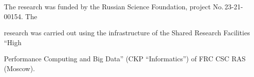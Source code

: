














\Ack



\vspace*{-3pt}





\noindent

The research was funded by the Russian Science Foundation, project No.\,23-21-00154. The 

research was carried out using the infrastructure of the Shared Research Facilities ``High 

Performance Computing and Big Data'' (CKP ``Informatics'') of FRC CSC RAS (Moscow).

 





